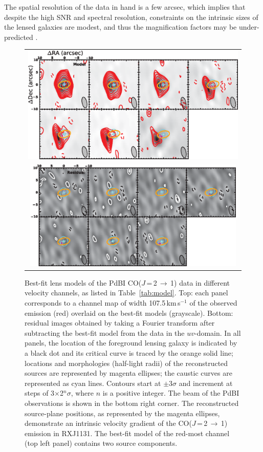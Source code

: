 \documentclass[]{emulateapj}
\newcommand{\rarr}{$\rightarrow$}
\newcommand{\bco}{\mbox{CO($J$\,=\,2\,\rarr\,1)}\xspace}
\newcommand{\kms}{\mbox{km\,s$^{-1}$}\xspace}
\newcommand{\Tab}[1]{Table~\ref{tab:#1}}
\begin{document}
The spatial resolution of the data in hand
is a few arcsec, which implies that despite the high SNR and spectral
resolution, constraints on the intrinsic sizes of the lensed galaxies are modest, and thus the magnification
factors may be under-predicted \citep[see e.g.,][]{Bussmann15a,Dye15a,Rybak15a}.

\begin{figure}[tbph]
\centering
\begin{tabular}{c}
\includegraphics[trim=0 0 0 0, clip, width=1.0\textwidth]{f6a.eps} \\
\includegraphics[width=0.98\textwidth]{f6b.eps}
\end{tabular}
\caption{Best-fit lens models of the PdBI \bco data in different velocity channels, as listed in \Tab{model}.
Top: each panel corresponds to a channel map of width 107.5\,\kms of the observed
emission (red) overlaid on the best-fit models (grayscale).
Bottom: residual images obtained by
taking a Fourier transform after subtracting the best-fit model from the
data in the $uv$-domain.
In all panels, the location of the foreground lensing galaxy is indicated by a black dot and
its critical curve is traced by the orange solid line; locations and
morphologies (half-light radii) of the reconstructed sources are
represented by magenta ellipses; the caustic curves are represented as cyan lines.
Contours start
at $\pm$3$\sigma$ and increment at steps of 3$\times$2$^n\sigma$,
where $n$ is a positive integer.
The beam of the PdBI observations is shown in the bottom right corner.
The reconstructed source-plane positions, as represented by the magenta ellipses, demonstrate an intrinsic velocity gradient of the \bco emission in RXJ1131.
The best-fit model of the red-most channel (top left panel) contains two source components.
\label{fig:model}}
\end{figure}
\end{document}
